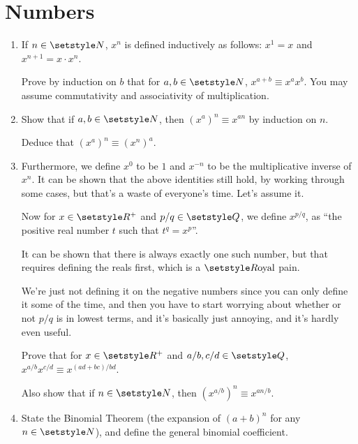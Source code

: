\section{Numbers}

\begin{enumerate}
 \item
  If \(n \in \Naturals\), \(x^n\) is defined inductively as follows:
  \(x^1 = x\) and \(x^{n + 1} = x \cdot x^n\).

  Prove by induction on \(b\) that for \(a, b \in \Naturals\),
  \(x^{a + b} \equiv x^a x^b\).
  You may assume commutativity and associativity of multiplication.
 \item
  Show that if \(a, b \in \Naturals\), then
  \((x^a)^n \equiv x^{an}\) by induction on \(n\).

  Deduce that \((x^a)^n \equiv (x^n)^a\).
 \item
  Furthermore, we define \(x^0\) to be \(1\) and
  \(x^{-n}\) to be the multiplicative inverse of \(x^n\). It can be shown that
  the above identities still hold, by working through some cases, but that's a
  waste of everyone's time. Let's assume it.

  Now for \(x \in \Reals^+\) and \(p/q \in \Rationals\), we define \(x^{p/q}\),
  as ``the positive real number \(t\) such that \(t^q = x^p\)''.

  It can be shown that there is always exactly one such number, but that
  requires defining the reals first, which is a \(\Reals\text{oyal}\) pain.

  We're just not defining it on the negative numbers since you can only define
  it some of the time, and then you have to start worrying about whether or not
  \(p/q\) is in lowest terms, and it's basically just annoying, and it's hardly
  even useful.

  Prove that for \(x \in \Reals^+\) and \(a/b, c/d \in \Rationals\),
  \(x^{a/b} x^{c/d} \equiv x^{(ad + bc)/bd}\).

  Also show that if \(n \in \Naturals\), then \((x^{a/b})^n \equiv x^{an/b}\).
 \item
  State the Binomial Theorem
  (the expansion of \((a + b)^n\) for any \(n \in \Naturals\)), and define the
  general binomial coefficient.


\end{enumerate}
